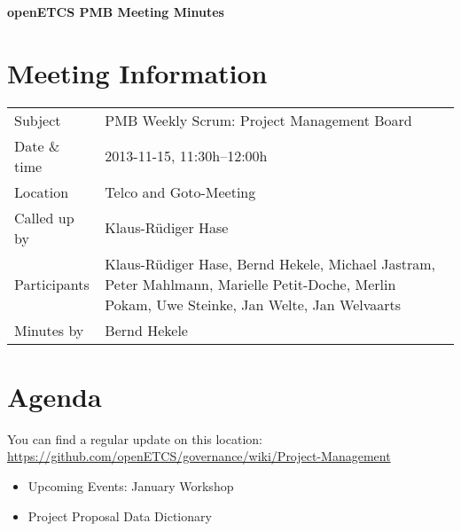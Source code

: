 \documentclass[a4paper, 11pt]{article}
\begin{document}
{\begin{center}\huge\bf openETCS PMB Meeting Minutes\end{center}}
\section{Meeting Information}

\renewcommand{\arraystretch}{1.5}
\begin{supertabular}{m{.2\textwidth}m{.8\textwidth}}
Subject & PMB Weekly Scrum: Project Management Board\\
Date \& time & 2013-11-15, 11:30h--12:00h\\
Location & Telco and Goto-Meeting\\
Called up by & Klaus-R\"udiger Hase\\
Participants &
Klaus-R\"udiger Hase,
Bernd Hekele,
Michael Jastram,
Peter Mahlmann,
Marielle Petit-Doche,
Merlin Pokam,
Uwe Steinke,
Jan Welte,
Jan Welvaarts
\\

Minutes by & Bernd Hekele\\

\end{supertabular}
\renewcommand{\arraystretch}{1.0}


\section{{Agenda}}
You can find a regular update on this location: \url{https://github.com/openETCS/governance/wiki/Project-Management}

\begin{itemize}
\item Upcoming Events: January Workshop
\item Project Proposal Data Dictionary
\end{itemize}
\end{document}
